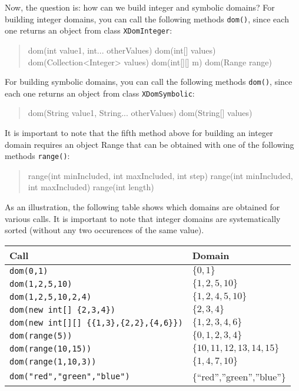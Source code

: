 \documentclass[10pt]{article}
\newcommand{\nn}[1]{{\tt #1}} %
\newenvironment{myvb}{\endgraf\small\verbatim}{\endverbatim}
\begin{document}
Now, the question is: how can we build integer and symbolic domains? %
For building integer domains, you can call the following methods \nn{dom()}, since each one returns an object from class \nn{XDomInteger}: 
\begin{quote}
\begin{myvb}
dom(int value1, int... otherValues) 
dom(int[] values) 
dom(Collection<Integer> values) 
dom(int[][] m) 
dom(Range range) 
\end{myvb}
\end{quote}

For building symbolic domains, you can call the following methods \nn{dom()}, since each one returns an object from class \nn{XDomSymbolic}: 
\begin{quote}
\begin{myvb}
dom(String value1, String... otherValues) 
dom(String[] values)
\end{myvb}
\end{quote}

It is important to note that the fifth method above for building an integer domain requires an object Range that can be obtained with one of the following methods \nn{range()}: 
\begin{quote}
\begin{myvb}
range(int minIncluded, int maxIncluded, int step) 
range(int minIncluded, int maxIncluded) 
range(int length) 
\end{myvb}
\end{quote}

  
As an illustration, the following table shows which domains are obtained for various calls.
It is important to note that integer domains are systematically sorted (without any two occurences of the same value).

\medskip\begin{tabular}{ll}
\toprule
Call & Domain \\
\midrule
\verb!dom(0,1)! & $\{0,1\}$  \\
\verb!dom(1,2,5,10)! & $\{1,2,5,10\}$  \\
\verb!dom(1,2,5,10,2,4)! & $\{1,2,4,5,10\}$  \\
\verb!dom(new int[] {2,3,4})! & $\{2,3,4\}$  \\
\verb!dom(new int[][] {{1,3},{2,2},{4,6}})! & $\{1,2,3,4,6\}$  \\
\verb!dom(range(5))! & $\{0,1,2,3,4\}$  \\
\verb!dom(range(10,15))! & $\{10,11,12,13,14,15\}$  \\
\verb!dom(range(1,10,3))! & $\{1,4,7,10\}$  \\
\verb!dom("red","green","blue")! & $\{$``red'',''green'',''blue''$\}$  \\
\bottomrule
\end{tabular}
\bigskip
\end{document}
